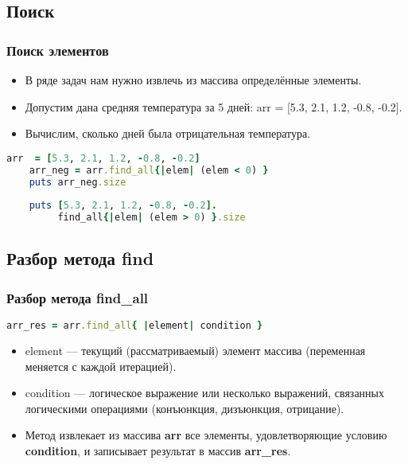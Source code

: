 \documentclass[compress,red]{beamer}
\begin{document}
\subsection{Поиск}
\begin{frame}[fragile]
  \frametitle{Поиск элементов}

  \begin{itemize}
    \item В ряде задач нам нужно извлечь из массива определённые элементы.
		\item Допустим дана средняя температура за 5 дней: arr = [5.3, 2.1, 1.2, -0.8, -0.2].
    \item Вычислим, сколько дней была отрицательная температура.
  \end{itemize}

  \begin{lstlisting}[language=ruby,basicstyle=\footnotesize,label=ruby7,caption=Метод find\_all]
    arr  = [5.3, 2.1, 1.2, -0.8, -0.2]
    arr_neg = arr.find_all{|elem| (elem < 0) }
    puts arr_neg.size
    
    puts [5.3, 2.1, 1.2, -0.8, -0.2].
         find_all{|elem| (elem > 0) }.size
  \end{lstlisting}
  
\end{frame}

\subsection{Разбор метода find}
\begin{frame}[fragile]
  \frametitle{Разбор метода find\_all}
  
  \begin{lstlisting}[language=ruby,basicstyle=\footnotesize,label=ruby8,caption=Общий вид find\_all]
    arr_res = arr.find_all{ |element| condition }
  \end{lstlisting}
  
  \begin{itemize}
    \item element --- текущий (рассматриваемый) элемент массива (переменная меняется с каждой итерацией).
    \item condition --- логическое выражение или несколько выражений, связанных логическими операциями (конъюнкция, дизъюнкция, отрицание).
    \item Метод извлекает из массива \textbf{arr} все элементы, удовлетворяющие условию \textbf{condition}, и записывает результат в массив \textbf{arr\_res}.
  \end{itemize}
  
\end{frame}
\end{document}
